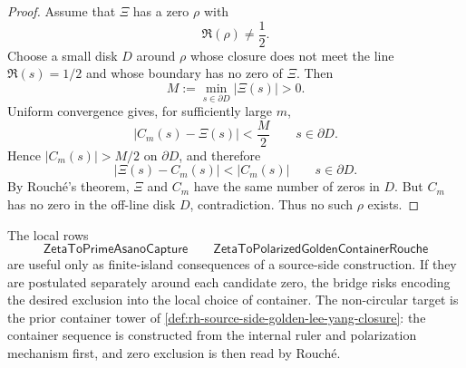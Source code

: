 \begin{proof}
Assume that $\Xi$ has a zero $\rho$ with
$$
\Re(\rho)\ne\frac12.
$$
Choose a small disk $D$ around $\rho$ whose closure does not meet the
line $\Re(s)=1/2$ and whose boundary has no zero of $\Xi$.  Then
$$
M:=\min_{s\in\partial D}|\Xi(s)|>0.
$$
Uniform convergence gives, for sufficiently large $m$,
$$
|C_m(s)-\Xi(s)|<\frac M2
\qquad
s\in\partial D.
$$
Hence $|C_m(s)|>M/2$ on $\partial D$, and therefore
$$
|\Xi(s)-C_m(s)|<|C_m(s)|
\qquad
s\in\partial D.
$$
By Rouch\'e's theorem, $\Xi$ and $C_m$ have the same number of zeros in
$D$.  But $C_m$ has no zero in the off-line disk $D$, contradiction.
Thus no such $\rho$ exists.
\end{proof}

\begin{principle}
\label{prin:rh-local-capture-not-final-bridge}
The local rows
$$
\mathsf{ZetaToPrimeAsanoCapture}
\qquad
\mathsf{ZetaToPolarizedGoldenContainerRouche}
$$
are useful only as finite-island consequences of a source-side
construction.  If they are postulated separately around each candidate
zero, the bridge risks encoding the desired exclusion into the local
choice of container.  The non-circular target is the prior container
tower of \autoref{def:rh-source-side-golden-lee-yang-closure}: the
container sequence is constructed from the internal ruler and
polarization mechanism first, and zero exclusion is then read by
Rouch\'e.
\end{principle}
